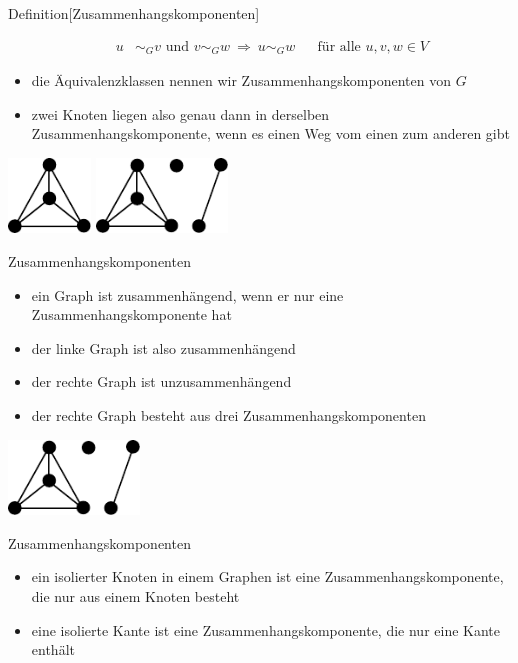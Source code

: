 \documentclass[aspectratio=1610, 11pt]{beamer}
\begin{document}
\begin{frame}
\begin{overprint}
\begin{block}{Definition\hfill[Zusammenhangskomponenten]}
\begin{itemize}
\begin{align*}
u&\sim_G v\mbox{ und }v\sim_G w\ \Rightarrow\ u\sim_G w&&\mbox{f\"ur alle }u,v,w\in V
			\end{align*}
		\item die \"Aquivalenzklassen nennen wir \alert{Zusammenhangskomponenten} von $G$
		\item zwei Knoten liegen also genau dann in derselben Zusammenhangskomponente, wenn es einen Weg vom einen zum anderen gibt
	\end{itemize}
	\end{block}
		\includegraphics[height=20mm]{images/k4.pdf}\hfill
		\includegraphics[height=20mm]{images/k4plusStuff.pdf}
\begin{exampleblock}{Zusammenhangskomponenten}
	\begin{itemize}
		\item ein Graph ist \alert{zusammenh\"angend}, wenn er nur eine Zusammenhangskomponente hat
		\item der linke Graph ist also zusammenh\"angend
		\item der rechte Graph ist unzusammenh\"angend
		\item der rechte Graph besteht aus drei Zusammenhangskomponenten
	\end{itemize}
	\end{exampleblock}
		\hfill\includegraphics[height=20mm]{images/k4plusStuff.pdf}
\begin{exampleblock}{Zusammenhangskomponenten}
	\begin{itemize}
		\item ein \alert{isolierter Knoten} in einem Graphen ist eine Zusammenhangskomponente, die nur aus einem Knoten besteht
		\item eine \alert{isolierte Kante} ist eine Zusammenhangskomponente, die nur eine Kante enth\"alt
	\end{itemize}
	\end{exampleblock}
	\end{overprint}
\end{frame}
\end{document}
